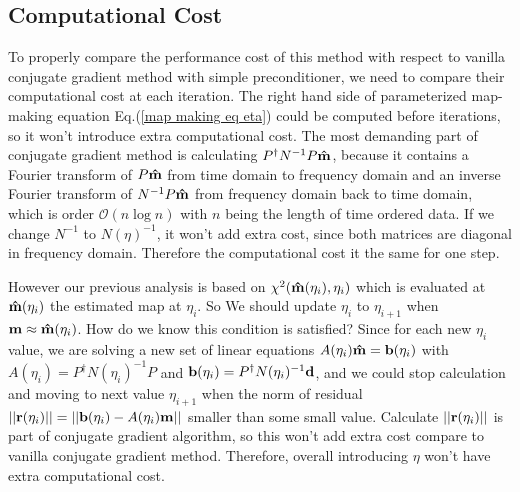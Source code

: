 \documentclass[twocolumn,linenumbers]{aastex631}
\newcommand{\vbd}{\vb{d}}
\newcommand{\vbm}{\vb{m}}
\newcommand{\vbb}{\vb{b}}
\newcommand{\inv}[1]{#1^{-1}}
\newcommand{\hatm}{\vb{\hat{m}}}
\newcommand{\Pdagger}{P^{\dagger}}
\begin{document}
\subsection{Computational Cost}
To properly compare the performance cost of this method with respect to vanilla
conjugate gradient method with simple preconditioner,
we need to compare their computational cost at each iteration.
The right hand side of parameterized map-making equation
Eq.(\ref{map making eq eta})
could be computed before iterations,
so it won't introduce extra computational cost.
The most demanding part of conjugate gradient method is calculating
$\Pdagger \inv{N} P \hatm$, because it contains a Fourier transform of
$P\hatm$ from time domain to frequency domain and an inverse Fourier transform
of $\inv{N} P \hatm$ from frequency domain back to time domain,
which is order $\mathcal{O}(n\log n)$ with $n$ being the length of time ordered
data.
If we change $\inv{N}$ to $\inv{N(\eta)}$, it won't add extra cost,
since both matrices are diagonal in frequency domain.
Therefore the computational cost it the same for one step.

However our previous analysis is based on
$\chi^2(\hatm(\eta_i), \eta_i)$ which is evaluated at 
$\hatm(\eta_i)$ the estimated map at $\eta_i$.
So We should update $\eta_i$ to $\eta_{i+1}$ when $\vbm \approx \hatm(\eta_i)$. 
How do we know this condition is satisfied?
Since for each new $\eta_i$ value, we are solving a new set of linear
equations $A(\eta_i) \hatm = \vbb(\eta_i)$ with
$A(\eta_i) = \Pdagger \inv{N(\eta_i)} P$ and 
$\vbb(\eta_i) = \Pdagger \inv{N(\eta_i)} \vbd$,
and we could stop calculation and moving to next value $\eta_{i+1}$ when the 
norm of residual 
$\qty||\vb{r}(\eta_i)|| = \qty||\vbb(\eta_i) - A(\eta_i) \vbm||$
smaller than some small value.
Calculate $\qty||\vb{r}(\eta_i)||$ is part of conjugate gradient algorithm,
so this won't add extra cost compare to vanilla conjugate gradient method.
Therefore, overall introducing $\eta$ won't have extra computational cost.
\end{document}

